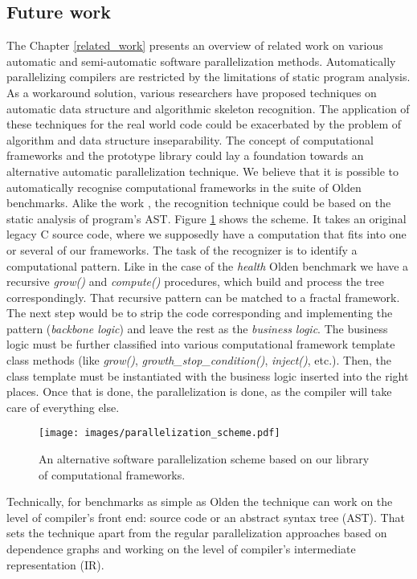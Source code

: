 \subsection{Future work}
\label{frameworks_fw}
\quad The Chapter \ref{related_work} presents an overview of related work on various automatic and semi-automatic software parallelization methods. Automatically parallelizing compilers are restricted by the limitations of static program analysis. As a workaround solution, various researchers have proposed techniques on automatic data structure and algorithmic skeleton recognition. The application of these techniques for the real world code could be exacerbated by the problem of algorithm and data structure inseparability.\newline\null
\quad The concept of computational frameworks and the prototype library could lay a foundation towards an alternative automatic parallelization technique. We believe that it is possible to automatically recognise computational frameworks in the suite of Olden benchmarks. Alike the work \cite{skeletons-static}, the recognition technique could be based on the static analysis of program's AST. Figure \ref{fig:parallelization_scheme} shows the scheme. It takes an original legacy C source code, where we supposedly have a computation that fits into one or several of our frameworks. The task of the recognizer is to identify a computational pattern. Like in the case of the \textit{health} Olden benchmark we have a recursive \textit{grow()} and \textit{compute()} procedures, which build and process the tree correspondingly. That recursive pattern can be matched to a fractal framework. The next step would be to strip the code corresponding and implementing the pattern (\textit{backbone logic}) and leave the rest as the \textit{business logic}. The business logic must be further classified into various computational framework template class methods (like \textit{grow()}, \textit{growth\_stop\_condition()}, \textit{inject()}, etc.). Then, the class template must be instantiated with the business logic inserted into the right places. Once that is done, the parallelization is done, as the compiler will take care of everything else.
\begin{figure}[!htb]
\texttt{[image: images/parallelization\_scheme.pdf]}
\caption{An alternative software parallelization scheme based on our library of computational frameworks.}
\label{fig:parallelization_scheme}
\end{figure}\newline\null
\quad Technically, for benchmarks as simple as Olden the technique can work on the level of compiler's front end: source code or an abstract syntax tree (AST). That sets the technique apart from the regular parallelization approaches based on dependence graphs and working on the level of compiler's intermediate representation (IR).

